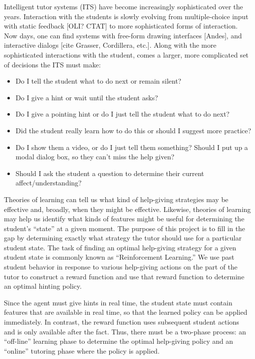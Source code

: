 \documentclass{edm_template}
\begin{document}
Intelligent tutor systems (ITS) have become increasingly sophisticated
over the years.  Interaction with the students is slowly evolving
from multiple-choice input with static feedback [OLI? CTAT] to more 
sophisticated forms of interaction.  Now days, one can find systems with 
free-form drawing interfaces [Andes], and interactive dialogs [cite Grasser,
Cordillera, etc.].  Along with the more sophisticated interactions
with the student, comes a larger, more complicated set of 
decisions the ITS must make:
%
\begin{itemize}
   \item Do I tell the student what to do next or remain silent?

   \item Do I give a hint or wait until the student asks?

   \item Do I give a pointing hint or do I just tell the student 
         what to do next?

   \item Did the student really learn how to do this or should
         I suggest more practice?

   \item Do I show them a video, or do I just tell them something?
         Should I put up a modal dialog box, so they can't miss the
         help given?

   \item Should I ask the student a question to determine their 
         current affect/understanding?

\end{itemize}

Theories of learning can tell us what kind of help-giving
strategies may be effective and, broadly, when they might be effective.
Likewise, theories of learning may help us identify what kinds of 
features might be useful for determining the student's ``state'' at
a given moment.  The purpose of this project is to fill in the gap
by determining exactly what strategy the tutor should use for a 
particular student state.
The task of finding an optimal help-giving strategy for a
given student state is commonly known as ``Reinforcement Learning.''
We use past student behavior in response to various help-giving
actions on the part of the tutor to construct a reward function
and use that reward function to determine an optimal hinting policy.

Since the agent must give hints in real time, the student state
must contain features that are available in real time, so that
the learned policy can be applied immediately.  In contrast,
the reward function uses subsequent student actions and is only
available after the fact.  Thus, there must be a two-phase process:
an ``off-line'' learning phase to determine the optimal help-giving 
policy and an ``online'' tutoring phase where the policy is applied.
\end{document}
